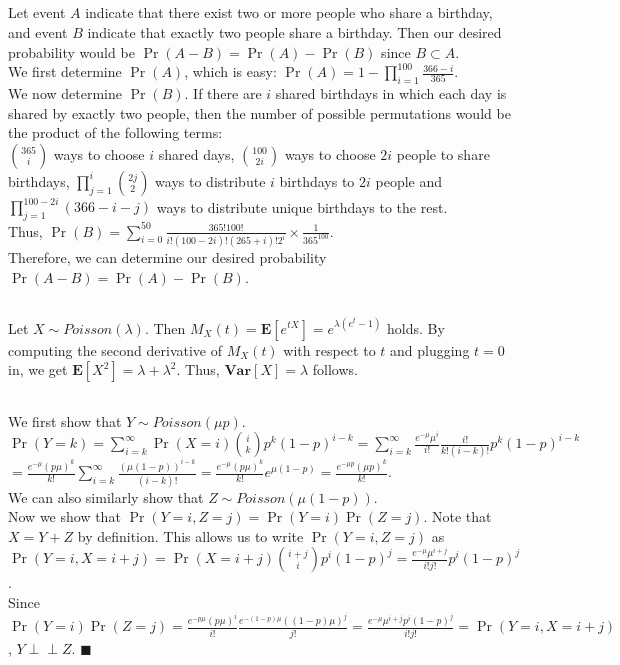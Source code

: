\documentclass{article}
\begin{document}
\subsection{}
Let event $A$ indicate that there exist two or more people who share a birthday, and event $B$ indicate that exactly two people share a birthday.
Then our desired probability would be $\Pr(A-B)=\Pr(A)-\Pr(B)$ since $B\subset A$.\\
We first determine $\Pr(A)$, which is easy: $\Pr(A)=1-\prod\limits_{i=1}^{100}\frac{366-i}{365}$.\\
We now determine $\Pr(B)$. If there are $i$ shared birthdays in which each day is shared by exactly two people, then the number of possible permutations would be the product of the following terms:\\
$\binom{365}{i}$ ways to choose $i$ shared days, 
$\binom{100}{2i}$ ways to choose $2i$ people to share birthdays,
$\prod\limits_{j=1}^i\binom{2j}{2}$ ways to distribute $i$ birthdays to $2i$ people
and $\prod\limits_{j=1}^{100-2i}(366-i-j)$ ways to distribute unique birthdays to the rest.\\
Thus, $\Pr(B)=\sum\limits_{i=0}^{50}\frac{365!100!}{i!(100-2i)!(265+i)!2^i}\times\frac{1}{365^{100}}$.\\
Therefore, we can determine our desired probability $\Pr(A-B)=\Pr(A)-\Pr(B)$.
\subsection{}
Let $X\sim Poisson(\lambda)$. Then $M_X(t)=\textbf{E}[e^{tX}]=e^{\lambda(e^t-1)}$ holds.
By computing the second derivative of $M_X(t)$ with respect to $t$ and plugging $t=0$ in, we get $\textbf{E}[X^2]=\lambda+\lambda^2$.
Thus, $\textbf{Var}[X]=\lambda$ follows.
\subsection{}
We first show that $Y\sim Poisson(\mu p)$.\\
$\Pr(Y=k)=\sum\limits_{i=k}^\infty\Pr(X=i)\binom{i}{k}p^k(1-p)^{i-k}=\sum\limits_{i=k}^\infty\frac{e^{-\mu}\mu^i}{i!}\frac{i!}{k!(i-k)!}p^k(1-p)^{i-k}$\\
$=\frac{e^{-\mu}(p\mu)^k}{k!}\sum\limits_{i=k}^\infty\frac{(\mu(1-p))^{i-k}}{(i-k)!}=\frac{e^{-\mu}(p\mu)^k}{k!}e^{\mu(1-p)}=\frac{e^{-\mu p}(\mu p)^k}{k!}$.\\
We can also similarly show that $Z\sim Poisson(\mu(1-p))$.\\
Now we show that $\Pr(Y=i,Z=j)=\Pr(Y=i)\Pr(Z=j)$. Note that $X=Y+Z$ by definition.
This allows us to write $\Pr(Y=i,Z=j)$ as $\Pr(Y=i,X=i+j)=\Pr(X=i+j)\binom{i+j}{i}p^{i}(1-p)^{j}=\frac{e^{-\mu}\mu^{i+j}}{i!j!}p^i(1-p)^j$.\\
Since $\Pr(Y=i)\Pr(Z=j)=\frac{e^{-p\mu}(p\mu)^i}{i!}\frac{e^{-(1-p)\mu}((1-p)\mu)^j}{j!}=\frac{e^{-\mu}\mu^{i+j}p^i(1-p)^j}{i!j!}=\Pr(Y=i,X=i+j)$,
$Y \perp\!\!\!\perp Z$. $\blacksquare$
\end{document}
